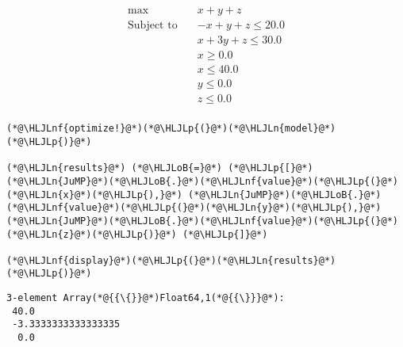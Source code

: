 \documentclass[12pt,a4paper]{article}
\newcommand{\HLJLn}[1]{#1}
\newcommand{\HLJLnf}[1]{\textcolor[RGB]{66,102,213}{#1}}
\newcommand{\HLJLoB}[1]{\textcolor[RGB]{102,102,102}{\textbf{#1}}}
\newcommand{\HLJLp}[1]{#1}
\begin{document}
$$ \begin{alignat*}{1}\max\quad & x + y + z\\
\text{Subject to} \quad & -x + y + z \leq 20.0\\
 & x + 3 y + z \leq 30.0\\
 & x \geq 0.0\\
 & x \leq 40.0\\
 & y \leq 0.0\\
 & z \leq 0.0\\
\end{alignat*}
 $$

\begin{lstlisting}
(*@\HLJLnf{optimize!}@*)(*@\HLJLp{(}@*)(*@\HLJLn{model}@*)(*@\HLJLp{)}@*)

(*@\HLJLn{results}@*) (*@\HLJLoB{=}@*) (*@\HLJLp{[}@*)(*@\HLJLn{JuMP}@*)(*@\HLJLoB{.}@*)(*@\HLJLnf{value}@*)(*@\HLJLp{(}@*)(*@\HLJLn{x}@*)(*@\HLJLp{),}@*) (*@\HLJLn{JuMP}@*)(*@\HLJLoB{.}@*)(*@\HLJLnf{value}@*)(*@\HLJLp{(}@*)(*@\HLJLn{y}@*)(*@\HLJLp{),}@*) (*@\HLJLn{JuMP}@*)(*@\HLJLoB{.}@*)(*@\HLJLnf{value}@*)(*@\HLJLp{(}@*)(*@\HLJLn{z}@*)(*@\HLJLp{)}@*) (*@\HLJLp{]}@*)

(*@\HLJLnf{display}@*)(*@\HLJLp{(}@*)(*@\HLJLn{results}@*)(*@\HLJLp{)}@*)
\end{lstlisting}

\begin{lstlisting}
3-element Array(*@{{\{}}@*)Float64,1(*@{{\}}}@*):
 40.0
 -3.3333333333333335
  0.0
\end{lstlisting}
\end{document}
